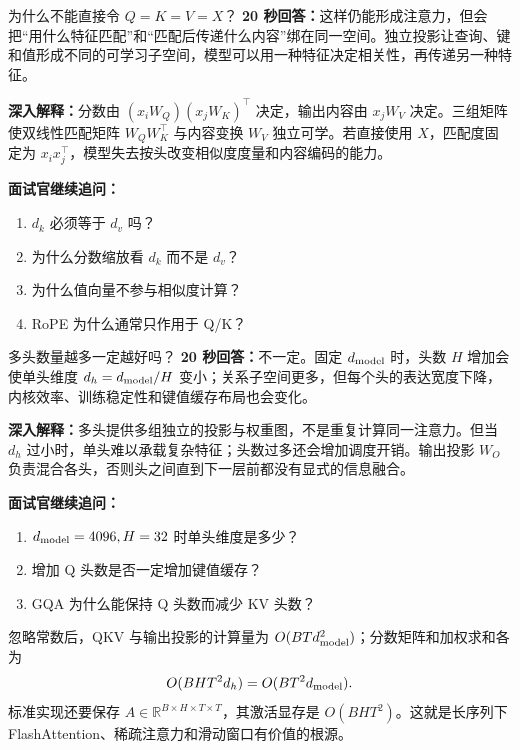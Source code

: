 \begin{interviewbox}{为什么不能直接令 $Q=K=V=X$？}
\textbf{20 秒回答：}这样仍能形成注意力，但会把“用什么特征匹配”和“匹配后传递什么内容”绑在同一空间。独立投影让查询、键和值形成不同的可学习子空间，模型可以用一种特征决定相关性，再传递另一种特征。

\textbf{深入解释：}分数由 $(x_iW_Q)(x_jW_K)^\top$ 决定，输出内容由 $x_jW_V$ 决定。三组矩阵使双线性匹配矩阵 $W_QW_K^\top$ 与内容变换 $W_V$ 独立可学。若直接使用 $X$，匹配度固定为 $x_i x_j^\top$，模型失去按头改变相似度度量和内容编码的能力。

\textbf{面试官继续追问：}
\begin{enumerate}
  \item $d_k$ 必须等于 $d_v$ 吗？
  \item 为什么分数缩放看 $d_k$ 而不是 $d_v$？
  \item 为什么值向量不参与相似度计算？
  \item RoPE 为什么通常只作用于 Q/K？
\end{enumerate}
\end{interviewbox}

\begin{interviewbox}{多头数量越多一定越好吗？}
\textbf{20 秒回答：}不一定。固定 $d_{\rm model}$ 时，头数 $H$ 增加会使单头维度 $d_h=d_{\rm model}/H$ 变小；关系子空间更多，但每个头的表达宽度下降，内核效率、训练稳定性和键值缓存布局也会变化。

\textbf{深入解释：}多头提供多组独立的投影与权重图，不是重复计算同一注意力。但当 $d_h$ 过小时，单头难以承载复杂特征；头数过多还会增加调度开销。输出投影 $W_O$ 负责混合各头，否则头之间直到下一层前都没有显式的信息融合。

\textbf{面试官继续追问：}
\begin{enumerate}
  \item $d_{\rm model}=4096,H=32$ 时单头维度是多少？
  \item 增加 Q 头数是否一定增加键值缓存？
  \item GQA 为什么能保持 Q 头数而减少 KV 头数？
\end{enumerate}
\end{interviewbox}

\begin{mathbox}
忽略常数后，QKV 与输出投影的计算量为 $O(BTd_{\rm model}^2)$；分数矩阵和加权求和各为
\[
O(BHT^2d_h)=O(BT^2d_{\rm model}).
\]
标准实现还要保存 $A\in\mathbb R^{B\times H\times T\times T}$，其激活显存是 $O(BHT^2)$。这就是长序列下 FlashAttention、稀疏注意力和滑动窗口有价值的根源。
\end{mathbox}

